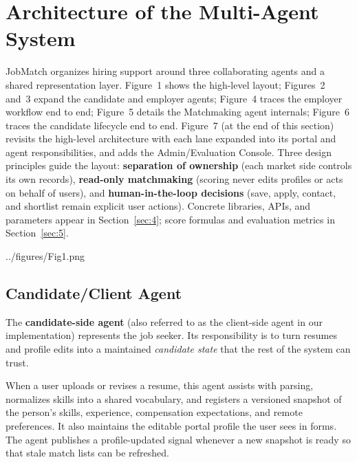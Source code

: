 \section{Architecture of the Multi-Agent System}\label{sec:3}

JobMatch organizes hiring support around three collaborating agents and a shared representation layer.
Figure~1 shows the high-level layout; Figures~2 and~3 expand the candidate and employer agents; Figure~4 traces the employer workflow end to end; Figure~5 details the Matchmaking agent internals; Figure~6 traces the candidate lifecycle end to end. Figure~7 (at the end of this section) revisits the high-level architecture with each lane expanded into its portal and agent responsibilities, and adds the Admin/Evaluation Console.
Three design principles guide the layout: \textbf{separation of ownership} (each market side controls its own records), \textbf{read-only matchmaking} (scoring never edits profiles or acts on behalf of users), and \textbf{human-in-the-loop decisions} (save, apply, contact, and shortlist remain explicit user actions).
Concrete libraries, APIs, and parameters appear in Section~\ref{sec:4}; score formulas and evaluation metrics in Section~\ref{sec:5}.

\begin{JFigure}{../figures/Fig1.png}
\vspace{1\baselineskip}
\end{JFigure}

\subsection{Candidate/Client Agent}\label{sec:3-candidate}

The \textbf{candidate-side agent} (also referred to as the client-side agent in our implementation) represents the job seeker.
Its responsibility is to turn resumes and profile edits into a maintained \emph{candidate state} that the rest of the system can trust.

When a user uploads or revises a resume, this agent assists with parsing, normalizes skills into a shared vocabulary, and registers a versioned snapshot of the person's skills, experience, compensation expectations, and remote preferences.
It also maintains the editable portal profile the user sees in forms.
The agent publishes a profile-updated signal whenever a new snapshot is ready so that stale match lists can be refreshed.

